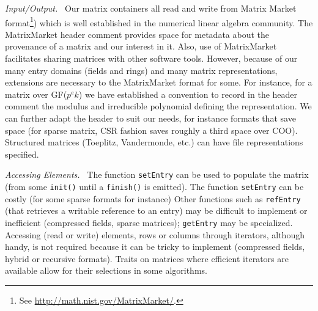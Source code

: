 \def\monitem#1{\par\textit{#1}\ }
\monitem{Input/Output.}
		Our matrix containers all read and write from Matrix Market
		format\footnote{See \url{http://math.nist.gov/MatrixMarket/}.})
		which is well established in the numerical linear algebra
community.
The MatrixMarket header comment provides space for metadata about the provenance of a matrix and our interest in it.  Also, use of MatrixMarket facilitates sharing matrices with other software tools.  However, because of our many entry domains (fields and rings) and many matrix representations, extensions are necessary to the MatrixMarket format for some.
For instance, for a matrix over GF($p^ek$) we have established a convention to record in the header comment the modulus and irreducible polynomial defining the representation.
		We can further adapt the header to suit our needs, for instance
		formats that save space (for sparse matrix, CSR fashion saves
		roughly a third space over COO). Structured
		matrices
(Toeplitz, Vandermonde, etc.)
can have file representations specified.
%
		\monitem{Accessing Elements.}
		The function \texttt{setEntry} can be
		used to populate the matrix (from some \texttt{init()} until a
		\texttt{finish()} is emitted).  The function \texttt{setEntry}
		can be costly (for some sparse formats for instance)
%
		Other functions such as {\tt refEntry} (that retrieves a
		writable reference to an entry) may be difficult to implement
		or inefficient (compressed fields, sparse matrices);
		\texttt{getEntry} may be specialized.
		Accessing (read or write) elements, rows or columns through
		iterators, although handy, is not required because it can be
		tricky to implement (compressed fields, hybrid or
		recursive formats). Traits on matrices where efficient iterators
		are available allow for their selections in some algorithms.
		\begin{comment}
		(\danger We cannot have {\tt const} iterators for all formats
		(see hybrid), walking through a matrix in unspecified order can
		be problematic, for instance, in an hom when a zero may
		alter/change the representation. I don't understand hom more
		than I understand init/rebind by the way, and I won't
		understand it until the morphism is given/chooseable/enforced.
		Rebind is really hom, so why is it in the interface anyway?
		This is the same with getEntry. We don't require it because we
		have a solution. Also, if apply is to be implemented via a
		domain or {\tt mul}, we could stress it is in the interface for
		convenience when writing code only. End of \danger)
		\end{comment}
